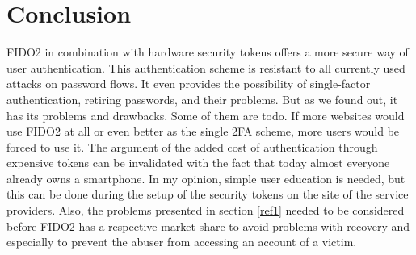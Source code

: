 \documentclass[runningheads]{llncs}
\begin{document}
\section{Conclusion}
FIDO2 in combination with hardware security tokens offers a more secure way of user authentication. This authentication scheme is resistant to all currently used attacks on password flows. It even provides the possibility of single-factor authentication, retiring passwords, and their problems. But as we found out, it has its problems and drawbacks. Some of them are todo. If more websites would use FIDO2 at all or even better as the single 2FA scheme, more users would be forced to use it. The argument of the added cost of authentication through expensive tokens can be invalidated with the fact that today almost everyone already owns a smartphone. In my opinion, simple user education is needed, but this can be done during the setup of the security tokens on the site of the service providers. Also, the problems presented in section \ref{ref1} needed to be considered before FIDO2 has a respective market share to avoid problems with recovery and especially to prevent the abuser from accessing an account of a victim.




\end{document}
